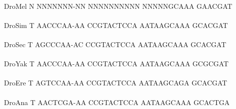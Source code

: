 \documentclass[11pt,twoside,reqno,a4paper]{article}
\begin{document}
{\\
DroMel	N	NNNNNNN-NN	NNNNNNNNNN	NNNNNGCAAA	GAACGAT\\
\hspace*{7\charwidth}\hspace*{1\charwidth}\hspace*{1\charwidth}\hspace*{1\charwidth}\hspace*{1\charwidth}\\
DroSim	T	AACCCAA-AA	CCGTACTCCA	AATAAGCAAA	GCACGAT\\
\hspace*{7\charwidth}\hspace*{1\charwidth}\hspace*{1\charwidth}\hspace*{1\charwidth}\hspace*{1\charwidth}\\
DroSec	T	AGCCCAA-AC	CCGTACTCCA	AATAAGCAAA	GCACGAT\\
\hspace*{7\charwidth}\hspace*{1\charwidth}\hspace*{1\charwidth}\hspace*{1\charwidth}\hspace*{1\charwidth}\\
DroYak	T	AACCCAA-AA	CCGTACTCCA	AATAAGCAAA	GCGCGAT\\
\hspace*{7\charwidth}\hspace*{1\charwidth}\hspace*{1\charwidth}\hspace*{1\charwidth}\hspace*{1\charwidth}\\
DroEre	T	AGTCCAA-AA	CCGTACTCCA	AATAAGCAGA	GCACGAT\\
\hspace*{7\charwidth}\hspace*{1\charwidth}\hspace*{1\charwidth}\hspace*{1\charwidth}\hspace*{1\charwidth}\\
DroAna	T	AACTCGA-AA	CCGTACTCCA	AATAAGCAAA	GCACTGA\\
\hspace*{7\charwidth}\hspace*{1\charwidth}\hspace*{1\charwidth}\hspace*{1\charwidth}\hspace*{1\charwidth}\\
}
\end{document}
